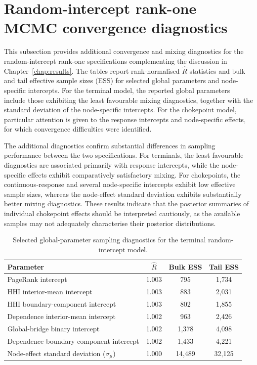 \documentclass[pdftex,12pt,openright,a4paper,oneside]{book}
\begin{document}
\section{Random-intercept rank-one MCMC convergence diagnostics}
\label{app:node_intercept_mcmc_diagnostics}

This subsection provides additional convergence and mixing diagnostics for the random-intercept rank-one specifications complementing the discussion in Chapter~\ref{chap:results}.
The tables report rank-normalised $\widehat{R}$ statistics and bulk and tail effective sample sizes (ESS) for selected global parameters and node-specific intercepts.
For the terminal model, the reported global parameters include those exhibiting the least favourable mixing diagnostics, together with the standard deviation 
of the node-specific intercepts. For the chokepoint model, particular attention is given to the response intercepts and node-specific effects, for which convergence difficulties were identified.

The additional diagnostics confirm substantial differences in sampling performance between the two specifications. 
For terminals, the least favourable diagnostics are associated primarily with response intercepts, while the node-specific effects exhibit comparatively satisfactory mixing.
For chokepoints, the continuous-response and several node-specific intercepts exhibit low effective sample sizes, whereas the node-effect standard deviation exhibits substantially better mixing diagnostics. 
These results indicate that the posterior summaries of individual chokepoint effects should be interpreted cautiously, as the available samples may not adequately characterise their posterior distributions.

\begin{table}[H]
\centering
\caption{Selected global-parameter sampling diagnostics
for the terminal random-intercept model.}
\label{tab:terminal_node_global_diagnostics}
\small
\begin{tabular}{lccc}
\hline
Parameter & $\widehat{R}$ & Bulk ESS & Tail ESS \\
\hline
PageRank intercept
& 1.003 & 795 & 1,734 \\

HHI interior-mean intercept
& 1.003 & 883 & 2,031 \\

HHI boundary-component intercept
& 1.003 & 802 & 1,855 \\

Dependence interior-mean intercept
& 1.002 & 963 & 2,426 \\

Global-bridge binary intercept
& 1.002 & 1,378 & 4,098 \\

Dependence boundary-component intercept
& 1.002 & 1,433 & 4,221 \\

Node-effect standard deviation ($\sigma_\mu$)
& 1.000 & 14,489 & 32,125 \\
\hline
\end{tabular}
\end{table}
\end{document}
